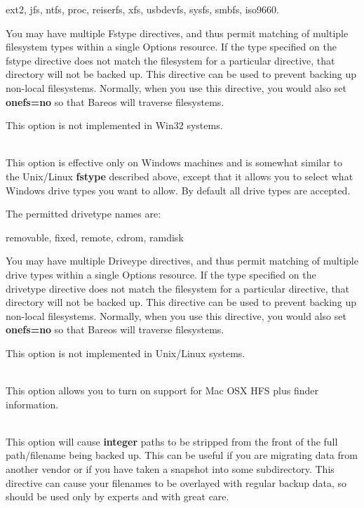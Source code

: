 \begin{description}
   ext2, jfs, ntfs, proc, reiserfs, xfs, usbdevfs, sysfs, smbfs,
   iso9660.

   You may have multiple Fstype directives, and thus permit matching
   of multiple filesystem types within a single Options resource.  If
   the type specified on the fstype directive does not match the
   filesystem for a particular directive, that directory will not be
   backed up.  This directive can be used to prevent backing up
   non-local filesystems. Normally, when you use this directive, you
   would also set {\bf onefs=no} so that Bareos will traverse filesystems.

   This option is not implemented in Win32 systems.

\item [DriveType=Windows-drive-type] \hfill \\
   This option is effective only on Windows machines and is
   somewhat similar to the Unix/Linux {\bf fstype} described
   above, except that it allows you to select what Windows
   drive types you want to allow.  By default all drive
   types are accepted.

   The permitted drivetype names are:

   removable, fixed, remote, cdrom, ramdisk

   You may have multiple Driveype directives, and thus permit matching
   of multiple drive types within a single Options resource.  If
   the type specified on the drivetype directive does not match the
   filesystem for a particular directive, that directory will not be
   backed up.  This directive can be used to prevent backing up
   non-local filesystems. Normally, when you use this directive, you
   would also set {\bf onefs=no} so that Bareos will traverse filesystems.

   This option is not implemented in Unix/Linux systems.

\item [hfsplussupport=yes{\textbar}no] \hfill \\
   This option allows you to turn on support for Mac OSX HFS plus
   finder information.

\item [strippath={\textless}integer{\textgreater}] \hfill \\
   This option will cause {\bf integer} paths to be stripped from
   the front of the full path/filename being backed up. This can
   be useful if you are migrating data from another vendor or if
   you have taken a snapshot into some subdirectory.  This directive
   can cause your filenames to be overlayed with regular backup data,
   so should be used only by experts and with great care.


\end{description}
